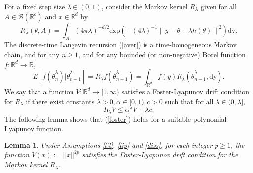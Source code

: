 \documentclass[a4paper]{article}
\newtheorem{lemma}[theorem]{Lemma}
\begin{document}
For a fixed step size $\lambda \in (0,1)$, consider the Markov kernel $R_{\lambda}$ given for all $A \in \mathcal{B}(\mathbb{R}^{d})$ and $x \in \mathbb{R}^{d}$ by
\begin{equation}\label{kernel_aver}
R_{\lambda}(\theta,A) = \int_{A}{ (4\pi \lambda)^{-d/2} \text{exp}\left(-(4\lambda)^{-1}\left\|y-\theta + \lambda  h(\theta) \right\|^2  \right)\mathrm{dy}.}
\end{equation}
The discrete-time Langevin recursion (\ref{aver}) is a time-homogeneous Markov chain, and for any $n\ge 1$, and for any bounded 
(or non-negative) Borel function $f:\mathbb{R}^{d}\to\mathbb{R}$,
$$E[f(\overline{\theta}^{\lambda}_n)|\overline{\theta}^{\lambda}_{n-1}] = R_{\lambda}f(\overline{\theta}^{\lambda}_{n-1}) = \int_{\mathbb{R}^{d}}{f(y)R_{\lambda}(\overline{\theta}^{\lambda}_{n-1},\mathrm{dy})}.$$
We say that a function $V:\mathbb{R}^{d} \to [1, \infty)$ satisfies a Foster-Lyapunov drift condition for $R_{\lambda}$ if there exist constants $\overline{\lambda} >0, \alpha \in [0,1), c>0$ such that for all $\lambda \in (0,\overline{\lambda}]$,
\begin{equation}\label{foster}
R_{\lambda}V \le \alpha^{\lambda} V + \lambda c.
\end{equation}
The following lemma shows that (\ref{foster}) holds for a suitable polynomial Lyapunov function. 
\begin{lemma}\label{lem_foster}Under Assumptions \ref{lll}, \ref{lip} and \ref{diss},
for each integer $p\geq 1$, the function
$V(x):=||x||^{2p}$
satisfies the Foster-Lyapunov drift condition for the Markov kernel $R_{\lambda}$.
\end{lemma}
\end{document}
